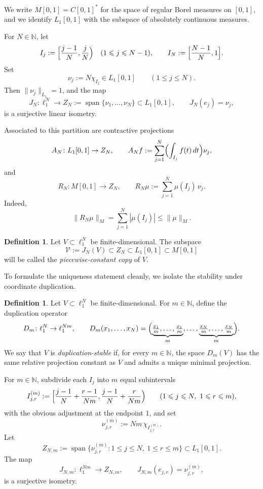 \documentclass[11pt]{amsart}
\numberwithin{equation}{section}
\theoremstyle{definition}
\newtheorem{definition}[theorem]{Definition}
\theoremstyle{remark}
\newcommand{\N}{\mathbb N}
\DeclareMathOperator{\spanop}{span}
\begin{document}
We write $M[0,1]=C[0,1]^*$ for the space of regular Borel measures on $[0,1]$, and we identify $L_1[0,1]$ with the subspace of absolutely continuous measures.

For $N\in\N$, let
\[
I_j:=\Bigl[\frac{j-1}{N},\frac{j}{N}\Bigr)
\quad (1\leqslant j\leqslant N-1),
\qquad
I_N:=\Bigl[\frac{N-1}{N},1\Bigr].
\]
Set
\[
\nu_j := N\chi_{I_j}\in L_1[0,1]
\qquad (1\leqslant j\leqslant N).
\]
Then $\|\nu_j\|_{L_1}=1$, and the map
\[
J_N\colon \ell_1^N\to Z_N:=\spanop\{\nu_1,\dots,\nu_N\}\subset L_1[0,1],
\qquad
J_N(e_j)=\nu_j,
\]
is a surjective linear isometry.

Associated to this partition are contractive projections
\[
A_N\colon L_1[0,1]\to Z_N,
\qquad
A_Nf := \sum_{j=1}^N \Bigl(\int_{I_j} f(t)\,dt\Bigr)\nu_j,
\]
and
\[
R_N\colon M[0,1]\to Z_N,
\qquad
R_N\mu := \sum_{j=1}^N \mu(I_j)\,\nu_j.
\]
Indeed,
\[
\|R_N\mu\|_{M} = \sum_{j=1}^N |\mu(I_j)| \leqslant \|\mu\|_M.
\]

\begin{definition}
Let $V\subset \ell_1^N$ be finite-dimensional. The subspace
\[
\mathscr V := J_N(V) \subset Z_N \subset L_1[0,1] \subset M[0,1]
\]
will be called the \emph{piecewise-constant copy} of $V$.
\end{definition}

To formulate the uniqueness statement cleanly, we isolate the stability under coordinate duplication.

\begin{definition}
Let $V\subset \ell_1^N$ be finite-dimensional. For $m\in\N$, define the duplication operator
\[
D_m\colon \ell_1^N\to \ell_1^{Nm},
\qquad
D_m(x_1,\dots,x_N)
=
\Bigl(\underbrace{\tfrac{x_1}{m},\dots,\tfrac{x_1}{m}}_{m},\dots,
\underbrace{\tfrac{x_N}{m},\dots,\tfrac{x_N}{m}}_{m}\Bigr).
\]
We say that $V$ is \emph{duplication-stable} if, for every $m\in\N$, the space $D_m(V)$ has the same relative projection constant as $V$ and admits a unique minimal projection.
\end{definition}

For $m\in\N$, subdivide each $I_j$ into $m$ equal subintervals
\[
I_{j,r}^{(m)}:=\Bigl[\frac{j-1}{N}+\frac{r-1}{Nm},\frac{j-1}{N}+\frac{r}{Nm}\Bigr)
\qquad (1\leqslant j\leqslant N,\ 1\leqslant r\leqslant m),
\]
with the obvious adjustment at the endpoint $1$, and set
\[
\nu_{j,r}^{(m)}:=Nm\,\chi_{I_{j,r}^{(m)}}.
\]
Let
\[
Z_{N,m}:=\spanop\{\nu_{j,r}^{(m)}:1\leqslant j\leqslant N,\ 1\leqslant r\leqslant m\}\subset L_1[0,1].
\]
The map
\[
J_{N,m}\colon \ell_1^{Nm}\to Z_{N,m},
\qquad
J_{N,m}(e_{j,r})=\nu_{j,r}^{(m)},
\]
is a surjective isometry.
\end{document}
